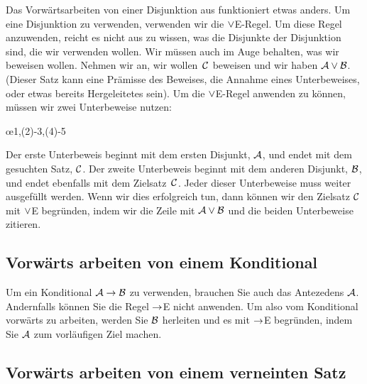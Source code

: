 Das Vorwärtsarbeiten von einer Disjunktion aus funktioniert etwas anders. Um eine Disjunktion zu verwenden, verwenden wir die $\vee$E-Regel. Um diese Regel anzuwenden, reicht es nicht aus zu wissen, was die Disjunkte der Disjunktion sind, die wir verwenden wollen. Wir müssen auch im Auge behalten, was wir beweisen wollen. Nehmen wir an, wir wollen~$\mathcal{C}$ beweisen und wir haben $\mathcal{A} \vee \mathcal{B}$. (Dieser Satz kann eine Prämisse des Beweises, die Annahme eines Unterbeweises, oder etwas bereits Hergeleitetes sein). Um die $\vee$E-Regel anwenden zu können, müssen wir zwei Unterbeweise nutzen:
\begin{fitchproof}
	\open
	\ellipsesline 
	\close 
	\open
	\ellipsesline
	\close
	\oe{1,(2)-3,(4)-5} 
\end{fitchproof} 
Der erste Unterbeweis beginnt mit dem ersten Disjunkt, $\mathcal{A}$, und endet mit dem gesuchten Satz, $\mathcal{C}$. Der zweite Unterbeweis beginnt mit dem anderen Disjunkt, $\mathcal{B}$, und endet ebenfalls mit dem Zielsatz~$\mathcal{C}$. Jeder dieser Unterbeweise muss weiter ausgefüllt werden. Wenn wir dies erfolgreich tun, dann können wir den Zielsatz $\mathcal{C}$ mit $\vee$E begründen, indem wir die Zeile mit $\mathcal{A} \vee \mathcal{B}$ und die beiden Unterbeweise zitieren.

\subsection*{Vorwärts arbeiten von einem Konditional}

Um ein Konditional $\mathcal{A} \rightarrow \mathcal{B}$ zu verwenden, brauchen Sie auch das Antezedens $\mathcal{A}$. Andernfalls können Sie die Regel $\rightarrow$E nicht anwenden. Um also vom Konditional vorwärts zu arbeiten, werden Sie $\mathcal{B}$ herleiten und es mit $\rightarrow$E begründen, indem Sie $\mathcal{A}$ zum vorläufigen Ziel machen.
\begin{fitchproof}
	\ellipsesline 
\end{fitchproof}

\subsection*{Vorwärts arbeiten von einem verneinten Satz}

